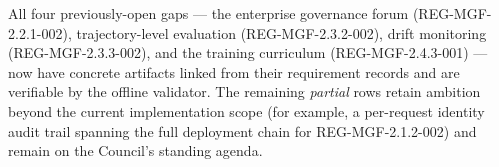 All four previously-open gaps --- the enterprise governance forum
(REG-MGF-2.2.1-002), trajectory-level evaluation (REG-MGF-2.3.2-002),
drift monitoring (REG-MGF-2.3.3-002), and the training curriculum
(REG-MGF-2.4.3-001) --- now have concrete artifacts linked from their
requirement records and are verifiable by the offline validator. The
remaining \emph{partial} rows retain ambition beyond the current
implementation scope (for example, a per-request identity audit trail
spanning the full deployment chain for REG-MGF-2.1.2-002) and remain
on the Council's standing agenda.
\clearpage
